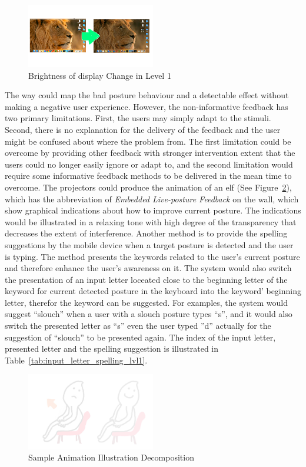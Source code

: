 \begin{figure}[h]
\centering
  \includegraphics[width=0.5\textwidth]{figs/brightness}
\caption{Brightness of display Change in Level 1}
\label{fig:brightnessChange}
\end{figure}

The way could map the bad posture behaviour and a detectable effect without making a negative user experience. However, the non-informative feedback has two primary limitations. First, the users may simply adapt to the stimuli. Second, there is no explanation for the delivery of the feedback and the user might be confused about where the problem from. The first limitation could be overcome by providing other feedback with stronger intervention extent that the users could no longer easily ignore or adapt to, and the second limitation would require some informative feedback methods to be delivered in the mean time to overcome. The projectors could produce the animation of an elf (See Figure~\ref{fig:transparent_elf}), which has the abbreviation of \textit{Embedded Live-posture Feedback} on the wall, which show graphical indications about how to improve current posture. The indications would be illustrated in a relaxing tone with high degree of the transparency that decreases the extent of interference. Another method is to provide the spelling suggestions by the mobile device when a target posture is detected and the user is typing. The method presents the keywords related to the user’s current posture and therefore enhance the user’s awareness on it. The system would also switch the presentation of an input letter loceated close to the beginning letter of the keyword for current detected posture in the keyboard into the keyword’ beginning letter, therefor the keyword can be suggested. For examples, the system would suggest ``slouch'' when a user with a slouch posture types “s”, and it would also switch the presented letter as ``s'' even the user typed ”d” actually for the suggestion of ``slouch'' to be presented again. The index of the input letter, presented letter and the spelling suggestion is illustrated in Table~\ref{tab:input_letter_spelling_lvl1}. 

\begin{figure}[h]
\centering
  \includegraphics[width=0.5\textwidth]{figs/transparent1}
\caption{Sample Animation Illustration Decomposition}
\label{fig:transparent_elf}
\end{figure}

